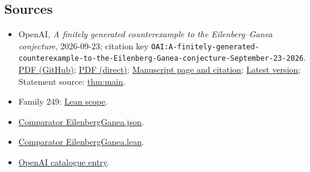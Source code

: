 \documentclass[11pt]{article}
\begin{document}
\subsection{Sources}
\begin{itemize}
\item OpenAI, \emph{A finitely generated counterexample to the Eilenberg–Ganea conjecture}, 2026-09-23; citation key \texttt{OAI:A-finitely-generated-counterexample-to-the-Eilenberg-Ganea-conjecture-September-23-2026}. \href{https://github.com/openai/math/blob/adc7f1241b42e322a6451854ab7e4b4c146bf78a/preprints/A-finitely-generated-counterexample-to-the-Eilenberg-Ganea-conjecture-September-23-2026/paper.pdf}{PDF (GitHub)}; \href{https://github.com/openai/math/raw/adc7f1241b42e322a6451854ab7e4b4c146bf78a/preprints/A-finitely-generated-counterexample-to-the-Eilenberg-Ganea-conjecture-September-23-2026/paper.pdf}{PDF (direct)}; \href{https://github.com/openai/math/blob/adc7f1241b42e322a6451854ab7e4b4c146bf78a/preprints/A-finitely-generated-counterexample-to-the-Eilenberg-Ganea-conjecture-September-23-2026/README.md}{Manuscript page and citation}; \href{https://github.com/openai/math/blob/main/preprints/A-finitely-generated-counterexample-to-the-Eilenberg-Ganea-conjecture-September-23-2026/paper.pdf}{Latest version}; Statement source: \href{https://github.com/openai/math/blob/adc7f1241b42e322a6451854ab7e4b4c146bf78a/preprints/A-finitely-generated-counterexample-to-the-Eilenberg-Ganea-conjecture-September-23-2026/build/sections/introduction.tex\#L15}{thm:main}.
\item Family 249: \href{https://github.com/openai/math/blob/adc7f1241b42e322a6451854ab7e4b4c146bf78a/lean/docs/249.md}{Lean scope}.
\item \href{https://github.com/openai/math/blob/adc7f1241b42e322a6451854ab7e4b4c146bf78a/lean/ComparatorChallenges/EilenbergGanea.json}{Comparator EilenbergGanea.json}.
\item \href{https://github.com/openai/math/blob/adc7f1241b42e322a6451854ab7e4b4c146bf78a/lean/ComparatorChallenges/EilenbergGanea.lean}{Comparator EilenbergGanea.lean}.
\item \href{https://github.com/openai/math/blob/adc7f1241b42e322a6451854ab7e4b4c146bf78a/CONTENTS.md}{OpenAI catalogue entry}.
\end{itemize}
\end{document}
